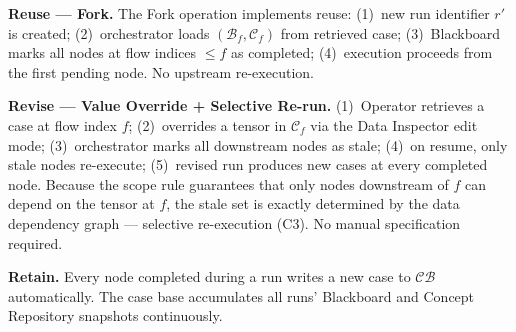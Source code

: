 \textbf{Reuse --- Fork.} The Fork operation implements reuse: (1)~new run identifier
$r'$ is created; (2)~orchestrator loads $(\mathcal{B}_f, \mathcal{C}_f)$ from retrieved
case; (3)~Blackboard marks all nodes at flow indices $\leq f$ as completed;
(4)~execution proceeds from the first pending node. No upstream re-execution.

\textbf{Revise --- Value Override + Selective Re-run.} (1)~Operator retrieves a case at
flow index $f$; (2)~overrides a tensor in $\mathcal{C}_f$ via the Data Inspector edit
mode; (3)~orchestrator marks all downstream nodes as stale; (4)~on resume, only stale
nodes re-execute; (5)~revised run produces new cases at every completed node. Because
the scope rule guarantees that only nodes downstream of $f$ can depend on the tensor at
$f$, the stale set is exactly determined by the data dependency graph --- selective
re-execution (C3). No manual specification required.

\textbf{Retain.} Every node completed during a run writes a new case to $\mathcal{CB}$
automatically. The case base accumulates all runs' Blackboard and Concept Repository
snapshots continuously.



